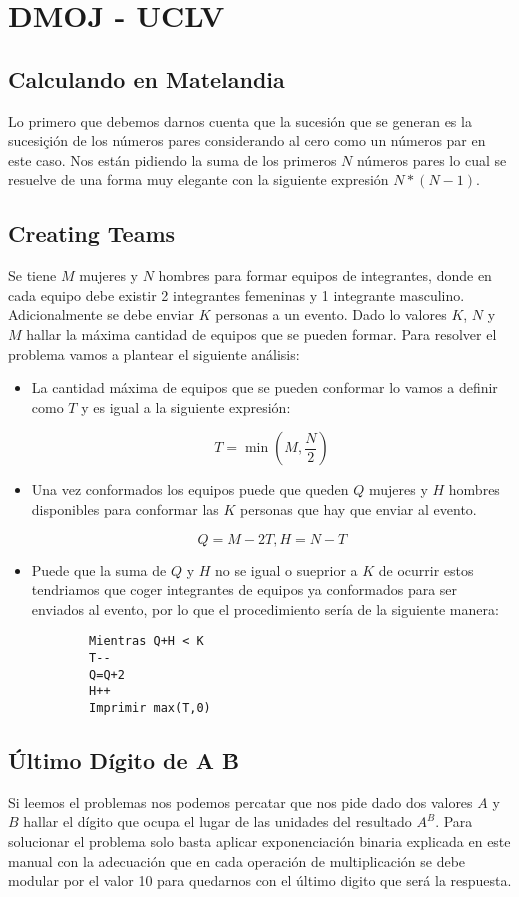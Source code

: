 \section{DMOJ - UCLV}

\subsection{Calculando en Matelandia} Lo primero que debemos darnos cuenta que la sucesión que se generan es la sucesiçión de los números pares considerando al cero como un números par en este caso. Nos están pidiendo la suma de los primeros $N$ números pares lo cual se resuelve de una forma muy elegante con la siguiente expresión $N*(N-1)$. 

\subsection{Creating Teams} Se tiene $M$ mujeres y $N$ hombres para formar equipos de integrantes, donde en cada equipo debe existir 2 integrantes femeninas y 1 integrante masculino. Adicionalmente se debe enviar $K$ personas a un evento. Dado lo valores $K$, $N$ y $M$ hallar la máxima cantidad de equipos que se pueden formar. Para resolver el problema vamos a plantear el siguiente análisis:

\begin{itemize}
	\item La cantidad máxima de equipos que se pueden conformar lo vamos a definir como $T$ y es igual a la siguiente expresión:
	
	$$T=\min (M, \frac{N}{2})$$
	
	\item Una vez conformados los equipos puede que queden $Q$ mujeres y $H$ hombres disponibles para conformar las $K$ personas que hay que enviar al evento.
	
	$$Q=M-2T , H=N-T$$
	
	\item Puede que la suma de $Q$ y $H$ no se igual o sueprior a $K$ de ocurrir estos tendriamos que coger integrantes de equipos ya conformados para ser enviados al evento, por lo que el procedimiento sería de la siguiente manera:
	\begin{lstlisting}
		Mientras Q+H < K 
		T--
		Q=Q+2
		H++
		Imprimir max(T,0)
	\end{lstlisting} 
	
	
\end{itemize}

\subsection{Último Dígito de A \^ B} Si leemos el problemas nos podemos percatar que nos pide dado dos valores $A$ y $B$ hallar el dígito que ocupa el lugar de las unidades del resultado $A^{B}$. Para solucionar el problema solo basta aplicar exponenciación binaria explicada en este manual con la adecuación que en cada operación de multiplicación se debe modular por el valor 10 para quedarnos con el último digito que será la respuesta.

